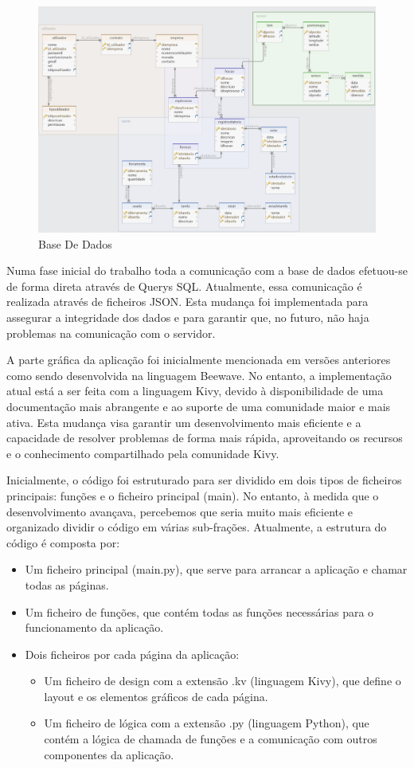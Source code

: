 \documentclass[a4paper,12pt]{report}
\begin{document}
		\begin{figure}[!h]
			\centering
			\includegraphics[width=0.7\linewidth]{BaseDeDados.png}
			\caption{Base De Dados}			\label{fig:BaseDeDados}
		\end{figure}

	Numa fase inicial do trabalho toda a comunicação com a base de dados efetuou-se de forma direta através de Querys SQL. Atualmente, essa comunicação é realizada através de ficheiros JSON. Esta mudança foi implementada para assegurar a integridade dos dados e para garantir que, no futuro, não haja problemas na comunicação com o servidor.
	
	A parte gráfica da aplicação foi inicialmente mencionada em versões anteriores como sendo desenvolvida na linguagem Beewave. No entanto, a implementação atual está a ser feita com a linguagem Kivy, devido à disponibilidade de uma documentação mais abrangente e ao suporte de uma comunidade maior e mais ativa. Esta mudança visa garantir um desenvolvimento mais eficiente e a capacidade de resolver problemas de forma mais rápida, aproveitando os recursos e o conhecimento compartilhado pela comunidade Kivy.
	
	Inicialmente, o código foi estruturado para ser dividido em dois tipos de ficheiros principais: funções e o ficheiro principal (main). No entanto, à medida que o desenvolvimento avançava, percebemos que seria muito mais eficiente e organizado dividir o código em várias sub-frações. 	Atualmente, a estrutura do código é composta por:
		
	\begin{itemize}
		\item Um ficheiro principal (main.py), que serve para arrancar a aplicação e chamar todas as páginas.
		
		\item Um ficheiro de funções, que contém todas as funções necessárias para o funcionamento da aplicação.
		
		\item Dois ficheiros por cada página da aplicação:
		\begin{itemize}
			\item Um ficheiro de design com a extensão .kv (linguagem Kivy), que define o layout e os elementos gráficos de cada página.
			
			\item Um ficheiro de lógica com a extensão .py (linguagem Python), que contém a lógica de chamada de funções e a comunicação com outros componentes da aplicação.
		\end{itemize}
	\end{itemize}
	
\end{document}
